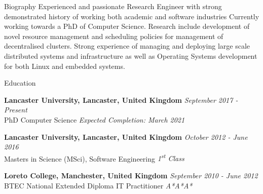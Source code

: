 \documentclass{resume} %
\begin{document}
	
\begin{rSection}{Biography}
	Experienced and passionate Research Engineer with strong demonstrated history of working both academic and software industries Currently working towards a PhD of Computer Science. Research include development of novel resource management and scheduling policies for management of decentralised clusters. Strong experience of managing and deploying large scale distributed systems and infrastructure as well as Operating Systems development for both Linux and embedded systems.  
\end{rSection}	



\begin{rSection}{Education}

{\bf Lancaster University, Lancaster, United Kingdom} \hfill {\em September 2017 - Present} 
\\ PhD Computer Science  \hfill {\em Expected Completion: March 2021}

{\bf Lancaster University, Lancaster, United Kingdom} \hfill {\em October 2012 - June 2016} 
\\ Masters in Science (MSci), Software Engineering \hfill {\em 1\textsuperscript{st} Class }

{\bf Loreto College,  Manchester, United Kingdom} \hfill {\em September 2010 - June 2012}
\\ BTEC National Extended Diploma IT Practitioner \hfill {\em A*A*A*}
\end{rSection}
\end{document}
